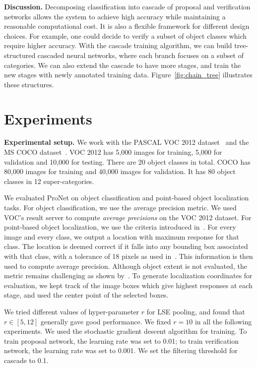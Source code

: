 \documentclass[10pt,twocolumn,letterpaper]{article}
\begin{document}
\textbf{Discussion.} Decomposing classification into cascade of proposal and verification networks allows the system to achieve high accuracy while maintaining a reasonable computational cost. It is also a flexible framework for different design choices. For example, one could decide to verify a subset of object classes which require higher accuracy. With the cascade training algorithm, we can build tree-structured cascaded neural networks, where each branch focuses on a subset of categories. We can also extend the cascade to have more stages, and train the new stages with newly annotated training data. Figure~\ref{fig:chain_tree} illustrates these structures.

\section{Experiments}
\textbf{Experimental setup.} We work with the PASCAL VOC 2012 dataset~\cite{Everingham10} and the MS COCO dataset~\cite{DBLP:journals/corr/LinMBHPRDZ14}. VOC 2012 has 5,000 images for training, 5,000 for validation and 10,000 for testing. There are 20 object classes in total. COCO has 80,000 images for training and 40,000 images for validation. It has 80 object classes in 12 super-categories.

We evaluated ProNet on object classification and point-based object localization tasks. For object classification, we use the average precision metric. We used VOC's result server to compute \textit{average precisions} on the VOC 2012 dataset. For point-based object localization, we use the criteria introduced in~\cite{Oquab_2015_CVPR}. For every image and every class, we output a location with maximum response for that class. The location is deemed correct if it falls into any bounding box associated with that class, with a tolerance of 18 pixels as used in~\cite{Oquab_2015_CVPR}. This information is then used to compute average precision. Although object extent is not evaluated, the metric remains challenging as shown by~\cite{Oquab_2015_CVPR}. To generate localization coordinates for evaluation, we kept track of the image boxes which give highest responses at each stage, and used the center point of the selected boxes.

We tried different values of hyper-parameter $r$ for LSE pooling, and found that $r\in[5,12]$ generally gave good performance. We fixed $r=10$ in all the following experiments. We used the stochastic gradient descent algorithm for training. To train proposal network, the learning rate was set to 0.01; to train verification network, the learning rate was set to 0.001. We set the  filtering threshold for cascade to 0.1.
\end{document}
